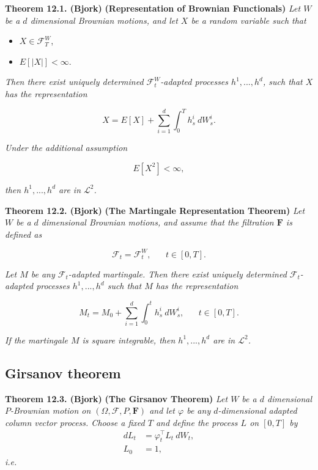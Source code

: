 \documentclass[a4paper,12pt,openany]{book}
\providecommand{\tightlist}{%
 \setlength{\itemsep}{0pt}\setlength{\parskip}{0pt}}
\begin{document}
\textbf{Theorem 12.1. (Bjork)} \textbf{(Representation of Brownian Functionals)} \emph{Let \(W\) be a \(d\) dimensional Brownian motions, and let \(X\) be a random variable such that}

\begin{itemize}
\tightlist
\item
  \(X\in\mathcal{F}^W_T\),
\item
  \(E[\vert X\vert]<\infty\).
\end{itemize}

\emph{Then there exist uniquely determined \(\mathcal{F}^W_t\)-adapted processes \(h^1,...,h^d\), such that \(X\) has the representation}

\[
X=E[X]+\sum_{i=1}^d\int_0^Th^i_s\ dW_s^i.\tag{12.2}
\]

\emph{Under the additional assumption}

\[
E[X^2]<\infty,
\]

\emph{then \(h^1,...,h^d\) are in \(\mathcal{L}^2\).}

\textbf{Theorem 12.2. (Bjork)} \textbf{(The Martingale Representation Theorem)} \emph{Let \(W\) be a \(d\) dimensional Brownian motions, and assume that the filtration \(\mathbf{F}\) is defined as}

\[
\mathcal{F}_t=\mathcal{F}^W_t,\hspace{20pt}t\in[0,T].
\]

\emph{Let \(M\) be any \(\mathcal{F}_t\)-adapted martingale. Then there exist uniquely determined \(\mathcal{F}_t\)-adapted processes \(h^1,...,h^d\) such that \(M\) has the representation}

\[
M_t=M_0+\sum_{i=1}^d\int_0^t h_s^i\ dW_s^i,\hspace{20pt}t\in[0,T].\tag{12.9}
\]

\emph{If the martingale \(M\) is square integrable, then \(h^1,...,h^d\) are in \(\mathcal{L}^2\).}

\hypertarget{girsanov-theorem}{%
\subsection{Girsanov theorem}\label{girsanov-theorem}}

\textbf{Theorem 12.3. (Bjork)} \textbf{(The Girsanov Theorem)} \emph{Let \(W\) be a \(d\) dimensional \(P\)-Brownian motion on \((\Omega,\mathcal{F},P,\mathbf{F})\) and let \(\varphi\) be any \(d\)-dimensional adapted column vector process. Choose a fixed \(T\) and define the process \(L\) on \([0,T]\) by}
\begin{align*}
dL_t&=\varphi^\top_t L_t\ dW_t,\tag{12.16}\\
L_0&=1,\tag{12.17}
\end{align*}
\emph{i.e.}
\end{document}
